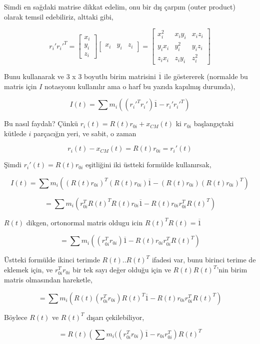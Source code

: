 \documentclass[12pt,fleqn]{article}\usepackage{../../common}
\begin{document}
Simdi en sağdaki matrise dikkat edelim, onu bir dış çarpım (outer product)
olarak temsil edebiliriz, alttaki gibi,

$$
r_i' r_i'^T = \left[\begin{array}{c}
x_i \\ y_i \\ z_i
\end{array}\right]
\left[\begin{array}{ccc}
x_i & y_i & z_i
\end{array}\right] =
\left[\begin{array}{ccc}
x_i^2 &  x_i y_i &  x_i z_i \\
y_i x_i & y_i^2 & y_i z_i \\
z_i x_i & z_i y_i & z_i^2
\end{array}\right]
$$

Bunu kullanarak ve 3 x 3 boyutlu birim matrisini $\overline{1}$ ile göstererek
(normalde bu matris için $I$ notasyonu kullanılır ama o harf bu yazıda
kapılmış durumda),

$$
I(t) = \sum m_i ((r_i'^T r_i') \overline{1} - r_i' r_i'^T)
$$

Bu nasıl faydalı? Çünkü $r_i(t) = R(t) r_{0i} + x_{CM}(t)$ ki $r_{0i}$
başlangıçtaki kütlede $i$ parçacığın yeri, ve sabit, o zaman

$$
r_i(t) - x_{CM}(t) = R(t) r_{0i} = r_i'(t)
$$

Şimdi $r_i'(t) = R(t) r_{0i}$ eşitliğini iki üstteki formülde kullanırsak,

$$
I(t) = \sum
m_i ( (R(t) r_{0i})^T  (R(t) r_{0i})  \overline{1} -  (R(t) r_{0i})  (R(t) r_{0i})^T  )
$$

$$
= \sum
m_i ( r_{0i}^T R(t)^T R(t) r_{0i} \overline{1} -  R(t) r_{0i} r_{0i}^T R(t)^T )
$$

$R(t)$ dikgen, ortonormal matris oldugu icin $R(t)^TR(t) = \overline{1}$

$$
= \sum
m_i ( (r_{0i}^T r_{0i}) \overline{1} -  R(t) r_{0i} r_{0i}^T R(t)^T )
$$


Üstteki formülde ikinci terimde $R(t) .. R(t)^T$ ifadesi var, bunu
birinci terime de eklemek için, ve $r_{0i}^T r_{0i}$ bir tek sayı değer
olduğu için ve $R(t) R(t)^T$'nin birim matris olmasından hareketle,

$$
= \sum
m_i ( R(t) (r_{0i}^T r_{0i}) R(t)^T \overline{1} -  R(t) r_{0i} r_{0i}^T R(t)^T )
$$

Böylece $R(t)$ ve $R(t)^T$ dışarı çekilebiliyor,

$$
= R(t) \left( \sum 
m_i (( r_{0i}^T r_{0i}) \overline{1} -  r_{0i} r_{0i}^T
\right)  R(t)^T 
$$
\end{document}
